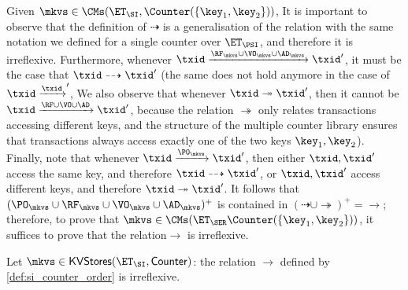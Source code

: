 Given $\mkvs \in \CMs(\ET_{\SI}, \Counter(\{\key_1, \key_2\}))$, 
It is important to observe that the definition of $\dashrightarrow$ is a generalisation of the relation 
with the same notation we defined for a single counter over $\ET_{\PSI}$, and therefore it is irreflexive. 
Furthermore, whenever $\txid \xrightarrow{\RF_{\mkvs} \cup \VO_{\mkvs} \cup \AD_{\mkvs}} \txid'$, it must be the case that 
$\txid \dashrightarrow \txid'$ (the same does not hold anymore in the case of $\txid \xrightarrow \txid'$, 
We also observe that whenever $\txid \twoheadrightarrow \txid'$, then it cannot be $\txid \xrightarrow{\RF \cup \VO \cup \AD} \txid'$, 
because the relation $\twoheadrightarrow$ only relates transactions accessing different keys, and the structure of 
the multiple counter library ensures that transactions always access exactly one of the two keys $\key_1, \key_2$). 
Finally, note that whenever $\txid \xrightarrow{\PO_{\mkvs}} \txid'$, then either $\txid, \txid'$ access the same 
key, and therefore $\txid \dashrightarrow \txid'$, or $\txid, \txid'$ access different keys, and therefore 
$\txid \twoheadrightarrow \txid'$. It follows that $(\PO_{\mkvs} \cup \RF_{\mkvs} \cup \VO_{\mkvs} \cup \AD_{\mkvs})^{+}$ 
is contained in $(\dashrightarrow \cup \twoheadrightarrow)^{+} = \rightarrow$; therefore, 
to prove that $\mkvs \in \CMs(\ET_{\SER}  \Counter(\{\key_1, \key_2\}))$, it suffices to prove that 
the relation$\rightarrow$ is irreflexive.
%

\begin{proposition}
Let $\mkvs \in \mathsf{KVStores}(\ET_{\SI}, \mathsf{Counter})$: the relation $\rightarrow$ 
defined by \cref{def:si_counter_order} is irreflexive.
\end{proposition}

